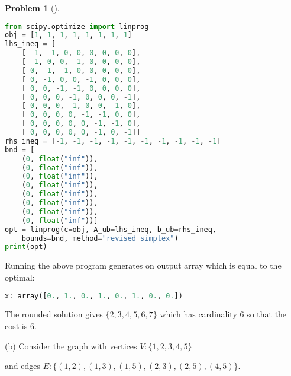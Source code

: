 \documentclass[11pt,twoside]{article}
\theoremstyle{definition}
\newtheorem{amsproblem}{Problem}
\newenvironment{problem}[1][]{%
  \begin{amsproblem}[#1]
  }{%
  \end{amsproblem}
}
\begin{document}
\begin{problem}
\begin{minipage}{\linewidth}%
\begin{lstlisting}[language=Python]
from scipy.optimize import linprog
obj = [1, 1, 1, 1, 1, 1, 1, 1]
lhs_ineq = [
	[ -1, -1, 0, 0, 0, 0, 0, 0],
	[ -1, 0, 0, -1, 0, 0, 0, 0],
	[ 0, -1, -1, 0, 0, 0, 0, 0],
	[ 0, -1, 0, 0, -1, 0, 0, 0],
	[ 0, 0, -1, -1, 0, 0, 0, 0],
	[ 0, 0, 0, -1, 0, 0, 0, -1],
	[ 0, 0, 0, -1, 0, 0, -1, 0],
	[ 0, 0, 0, 0, -1, -1, 0, 0],
	[ 0, 0, 0, 0, 0, -1, -1, 0],
	[ 0, 0, 0, 0, 0, -1, 0, -1]]
rhs_ineq = [-1, -1, -1, -1, -1, -1, -1, -1, -1, -1]
bnd = [
	(0, float("inf")),
	(0, float("inf")),
	(0, float("inf")),
	(0, float("inf")),
	(0, float("inf")),
	(0, float("inf")),
	(0, float("inf")),
	(0, float("inf"))] 
opt = linprog(c=obj, A_ub=lhs_ineq, b_ub=rhs_ineq, 
	bounds=bnd, method="revised simplex")
print(opt)
\end{lstlisting}
\end{minipage}



Running the above program generates on output array which is equal to the optimal:
\begin{lstlisting}[language=Python]
    x: array([0., 1., 0., 1., 0., 1., 0., 0.])
\end{lstlisting}





The rounded solution gives $\{2,3,4,5,6,7\}$ which has cardinality 6 so that the cost is 6.

(b) Consider the graph with vertices $V : \{1,2,3,4,5\} $ 

and edges $E : \{(1,2),(1,3),(1,5),(2,3),(2,5),(4,5)\} $. 



\end{problem}
\end{document}
